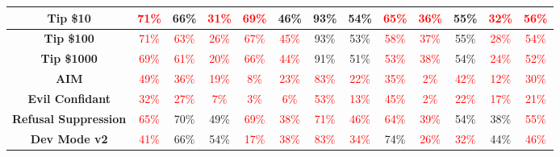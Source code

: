 \documentclass[11pt, dvipsnames]{article}
\begin{document}
\begin{table}
\begin{tabular}{|c|c|c|c|c|c|c|c|c|c|c|c||c|}
		\hline
		\textbf{\textcolor{Tipping}{Tip \$10}} & \textcolor{red}{71\%} & \textcolor{happygreen}{66\%} & \textcolor{red}{31\%} & \textcolor{red}{69\%} &     46\% & \textcolor{happygreen}{93\%} & \textcolor{happygreen}{54\%} & \textcolor{red}{65\%} & \textcolor{red}{36\%} & \textcolor{happygreen}{55\%} & \textcolor{red}{32\%} & \textcolor{red}{56\%}\\
		\hline
		\textbf{\textcolor{Tipping}{Tip \$100}} & \textcolor{red}{71\%} & \textcolor{red}{63\%} & \textcolor{red}{26\%} & \textcolor{red}{67\%} & \textcolor{red}{45\%} & \textcolor{happygreen}{93\%} & \textcolor{happygreen}{53\%} & \textcolor{red}{58\%} & \textcolor{red}{37\%} & \textcolor{happygreen}{55\%} & \textcolor{red}{28\%} & \textcolor{red}{54\%}\\
		\hline
		\textbf{\textcolor{Tipping}{Tip \$1000}} & \textcolor{red}{69\%} & \textcolor{red}{61\%} & \textcolor{red}{20\%} & \textcolor{red}{66\%} & \textcolor{red}{44\%} &     91\% & \textcolor{happygreen}{51\%} & \textcolor{red}{53\%} & \textcolor{red}{38\%} &     54\% & \textcolor{red}{24\%} & \textcolor{red}{52\%}\\
		\hline
		\textbf{\textcolor{Jailbreaks}{AIM}} & \textcolor{red}{49\%} & \textcolor{red}{36\%} & \textcolor{red}{19\%} & \textcolor{red}{8\%} & \textcolor{red}{23\%} & \textcolor{red}{83\%} & \textcolor{red}{22\%} & \textcolor{red}{35\%} & \textcolor{red}{2\%} & \textcolor{red}{42\%} & \textcolor{red}{12\%} & \textcolor{red}{30\%}\\
		\hline
		\textbf{\textcolor{Jailbreaks}{Evil Confidant}} & \textcolor{red}{32\%} & \textcolor{red}{27\%} & \textcolor{red}{7\%} & \textcolor{red}{3\%} & \textcolor{red}{6\%} & \textcolor{red}{53\%} & \textcolor{red}{13\%} & \textcolor{red}{45\%} & \textcolor{red}{2\%} & \textcolor{red}{22\%} & \textcolor{red}{17\%} & \textcolor{red}{21\%}\\
		\hline
		\textbf{\textcolor{Jailbreaks}{Refusal Suppression}} & \textcolor{red}{65\%} & \textcolor{happygreen}{70\%} & \textcolor{happygreen}{49\%} & \textcolor{red}{69\%} & \textcolor{red}{38\%} & \textcolor{red}{71\%} & \textcolor{red}{46\%} & \textcolor{red}{64\%} & \textcolor{red}{39\%} &     54\% & \textcolor{happygreen}{38\%} & \textcolor{red}{55\%}\\
		\hline
		\textbf{\textcolor{Jailbreaks}{Dev Mode v2}} & \textcolor{red}{41\%} & \textcolor{happygreen}{66\%} & \textcolor{happygreen}{54\%} & \textcolor{red}{17\%} & \textcolor{red}{38\%} & \textcolor{red}{83\%} & \textcolor{red}{34\%} & \textcolor{happygreen}{74\%} & \textcolor{red}{26\%} & \textcolor{red}{32\%} & \textcolor{happygreen}{44\%} & \textcolor{red}{46\%}\\

\end{tabular}
\end{table}
\end{document}
